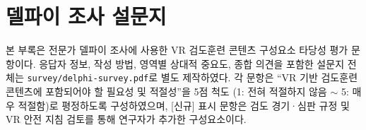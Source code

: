 \chapter{델파이 조사 설문지}\label{app:survey}

본 부록은 전문가 델파이 조사에 사용한 VR 검도훈련 콘텐츠 구성요소 타당성 평가 문항이다.
응답자 정보, 작성 방법, 영역별 상대적 중요도, 종합 의견을 포함한 설문지 전체는
\texttt{survey/delphi-survey.pdf}로 별도 제작하였다.
각 문항은 ``VR 기반 검도훈련 콘텐츠에 포함되어야 할 필요성 및 적절성''을 5점 척도
(1: 전혀 적절하지 않음 $\sim$ 5: 매우 적절함)로 평정하도록 구성하였으며,
{\color{DelphiNew}[신규]} 표시 문항은 검도 경기·심판 규정 및 VR 안전 지침 검토를 통해 연구자가 추가한 구성요소이다.

\ShowOpenBoxfalse

